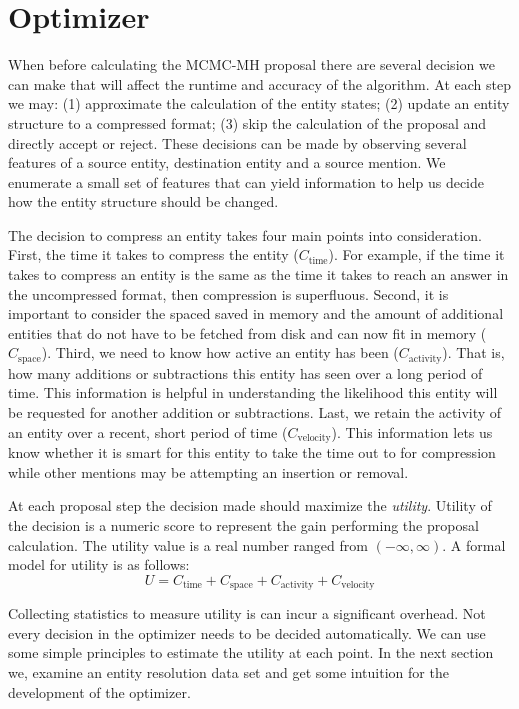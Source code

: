 \section{Optimizer}

When before calculating the MCMC-MH proposal there are several decision we can make
that will affect the runtime and accuracy of the algorithm.
At each step we may:
  (1) approximate the calculation of the entity states;
  (2) update an entity structure to a compressed format;
  (3) skip the calculation of the proposal and directly accept or reject.
These decisions can be made by observing several features of a source entity,
destination entity and a source mention.
We enumerate a small set of features that can yield information to
help us decide how the entity structure should be changed.

The decision to compress an entity takes
four main points into consideration. First, the time it takes to compress
the entity ($ C_\text{time}$).
For example, if the time it takes to compress an entity is the same as the time it takes to
reach an answer in the uncompressed format, then compression is superfluous.
Second, it is important to consider the spaced saved in memory and the amount of 
additional entities that do not have to be fetched from disk and can now fit in memory ($C_\text{space}$).
Third, we need to know how active an entity has been ($C_\text{activity}$).
That is, how many additions or subtractions this entity has seen over a long period of time.
This information is helpful in understanding the likelihood this entity will be requested
for another addition or subtractions.
Last, we retain the activity of an entity over a recent, short period of time
($C_\text{velocity}$). This information lets us know whether it is smart for
this entity to take the time out to for compression while other mentions may be
attempting an insertion or removal.

At each proposal step the decision made should maximize the \textit{utility}.
Utility of the decision is a numeric score to represent the gain performing
the proposal calculation. The utility value is a real number ranged from $( -\infty, \infty)$.
A formal model for utility is as follows:
\[
U = C_\text{time} + C_\text{space} + C_\text{activity} + C_\text{velocity}
\]

Collecting statistics to measure utility is can incur a significant overhead.
Not every decision in the optimizer needs to be decided automatically.
We can use some simple principles to estimate the utility at each point.
In the next section we, examine an entity resolution data set and get some
intuition for the development of the optimizer.





